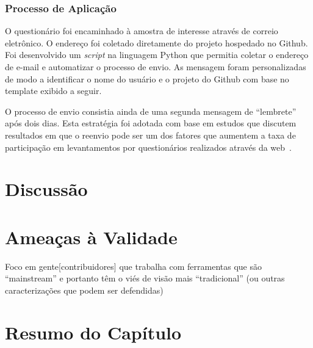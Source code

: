 
\subsubsection{Processo de Aplicação}
\label{ssub:processo_de_aplicação}

O questionário foi encaminhado à amostra de interesse através de correio
eletrônico. O endereço foi coletado diretamente do projeto hospedado no Github.
Foi desenvolvido um \textit{script} na linguagem Python que permitia coletar o
endereço de e-mail e automatizar o processo de envio. As mensagem foram
personalizadas de modo a identificar o nome do usuário e o projeto do Github
com base no template exibido a seguir.


O processo de envio consistia ainda de uma segunda mensagem de ``lembrete'' após
dois dias. Esta estratégia foi adotada com base em estudos que discutem
resultados em que o reenvio pode ser um dos fatores que aumentem a taxa de
participação em levantamentos por questionários realizados através da
web~\cite{fan2010factors}.

\section{Discussão}
\label{sec:sug_melhoria_discussao}

\section{Ameaças à Validade}
\label{sec:sug_melhoria_ameacas}

Foco em gente[contribuidores] que trabalha com ferramentas que são
``mainstream'' e portanto têm o viés de visão mais ``tradicional'' (ou outras
caracterizações que podem ser defendidas)

\section{Resumo do Capítulo}
\label{sec:sug_melhoria_resumo}
